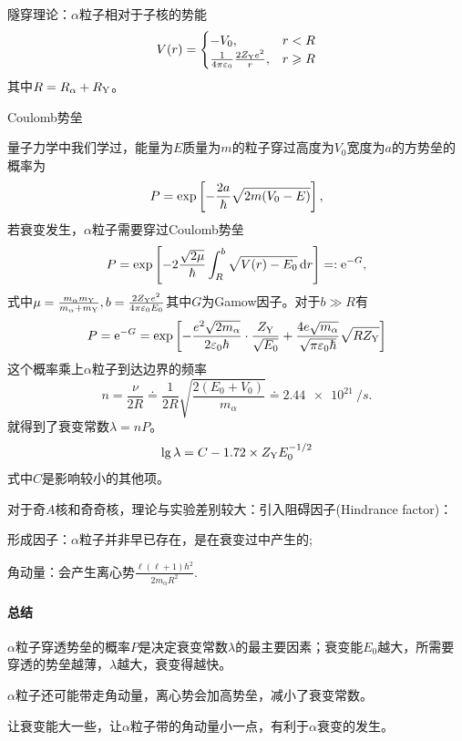 隧穿理论：$\alpha$粒子相对于子核的势能
\begin{align}
	V(r)=\begin{cases}
		-V_0,&r<R\\
		\frac1{4\pi\varepsilon_0}\frac{2Z_{\mathrm{Y}}e^2}r,&r\geqslant R
	\end{cases}
\end{align}
其中$R=R_\alpha+R_{\mathrm{Y}}$。
\begin{center}
	\tikzchap Coulomb势垒
\end{center}
量子力学中我们学过，能量为$E$质量为$m$的粒子穿过高度为$V_0$宽度为$a$的方势垒的概率为
\[
	P=\exp\left[-\frac{2a}\hbar\sqrt{2m(V_0-E)}\right],
\]
若衰变发生，$\alpha$粒子需要穿过Coulomb势垒
\[
	P=\exp\left[-2\frac{\sqrt{2\mu}}\hbar\int_R^b\sqrt{V(r)-E_0}\mathop{}\!\mathrm{d} r\right]=:\mathop{}\!\mathrm{e}^{-G},
\]
式中$\mu=\frac{m_\alpha m_{\mathrm{Y}}}{m_\alpha+m_{\mathrm{Y}}},b=\frac{2Z_{\mathrm{Y}}e^2}{4\pi\varepsilon_0 E_0}$其中$G$为Gamow因子。对于$b\gg R$有
\[
	P=\mathop{}\!\mathrm{e}^{-G}=\exp\left[-\frac{e^2\sqrt{2m_\alpha}}{2\varepsilon_0\hbar}\cdot\frac{Z_{\mathrm{Y}}}{\sqrt{E_0}}+\frac{4e\sqrt{m_\alpha }}{\sqrt{\pi\varepsilon_0\hbar}}\sqrt{RZ_{\mathrm{Y}}}\right]
\]
这个概率乘上$\alpha$粒子到达边界的频率
\[
	n=\frac{\nu}{2R}\doteq\frac1{2R}\sqrt{\frac{2(E_0+V_0)}{m_\alpha}}\doteq\SI{2.44e21}{/s}.
\]
就得到了衰变常数$\lambda=nP$。
\begin{align}
	\lg\lambda=C-1.72\times Z_{\mathrm{Y}}E_0^{-1/2}
\end{align}
式中$C$是影响较小的其他项。

对于奇$A$核和奇奇核，理论与实验差别较大：引入阻碍因子(Hindrance factor)：
\begin{compactenum}
	\item 形成因子：$\alpha$粒子并非早已存在，是在衰变过中产生的;
	\item 角动量：会产生离心势$\frac{\ell(\ell+1)\hbar^2}{2m_\alpha R^2}.$
\end{compactenum}
\paragraph{总结}
\begin{compactenum}
	\item $\alpha$粒子穿透势垒的概率$P$是决定衰变常数$\lambda$的最主要因素；衰变能$E_0$越大，所需要穿透的势垒越薄，$\lambda$越大，衰变得越快。
	\item $\alpha$粒子还可能带走角动量，离心势会加高势垒，减小了衰变常数。
\end{compactenum}
让衰变能大一些，让$\alpha$粒子带的角动量小一点，有利于$\alpha$衰变的发生。
